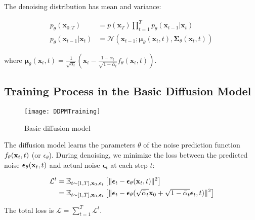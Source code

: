 The denoising distribution has mean and variance:

\begin{equation}
	\label{eq:denoising_process}
	\begin{aligned}
		p_\theta(\mathbf{x}_{0:T})
		&= p(\mathbf{x}_T) \prod^T_{t=1} p_\theta(\mathbf{x}_{t-1} \vert \mathbf{x}_t) \\
		p_\theta(\mathbf{x}_{t-1} \vert \mathbf{x}_t) &= \mathcal{N}(\mathbf{x}_{t-1};  \boldsymbol{\mu}_\theta(\mathbf{x}_t, t), \boldsymbol{\Sigma}_\theta(\mathbf{x}_t, t))
	\end{aligned}
\end{equation}

where $\boldsymbol{\mu}_\theta(\mathbf{x}_t, t) = {\frac{1}{\sqrt{\alpha_t}} \left( \mathbf{x}_t - \frac{1 - \alpha_t}{\sqrt{1 - \bar{\alpha}_t}}  f_\theta(\mathbf{x}_t, t) \right)}$.

\subsection{Training Process in the Basic Diffusion Model}

\begin{figure}[h]
	\centering
	\texttt{[image: DDPMTraining]}
	\caption{Basic diffusion model}
	\label{fig:basic_diffusion}
	\vspace{-5pt}
\end{figure}

The diffusion model learns the parameters $\theta$ of the noise prediction function $f_{\theta}(\mathbf{x}_t, t)$ (or $\epsilon_\theta$). During denoising, we minimize the loss between the predicted noise $\boldsymbol{\epsilon}_\theta(\mathbf{x}_t, t)$ and actual noise $\boldsymbol{\epsilon}_t$ at each step $t$:

\begin{equation}
	\label{eq:diffusion_loss}
	\begin{aligned}
		\mathcal{L}^t
		&= \mathbb{E}_{t \sim [1, T], \mathbf{x}_0, \boldsymbol{\epsilon}_t} \left[\|\boldsymbol{\epsilon}_t - \boldsymbol{\epsilon}_\theta(\mathbf{x}_t, t)\|^2 \right] \\
		&= \mathbb{E}_{t \sim [1, T], \mathbf{x}_0, \boldsymbol{\epsilon}_t} \left[\|\boldsymbol{\epsilon}_t - \boldsymbol{\epsilon}_\theta(\sqrt{\bar{\alpha}_t}\mathbf{x}_0 + \sqrt{1 - \bar{\alpha}_t}\boldsymbol{\epsilon}_t, t)\|^2 \right]
	\end{aligned}
\end{equation}

The total loss is $\mathcal{L} = \sum_{t=1}^T \mathcal{L}^t$.

